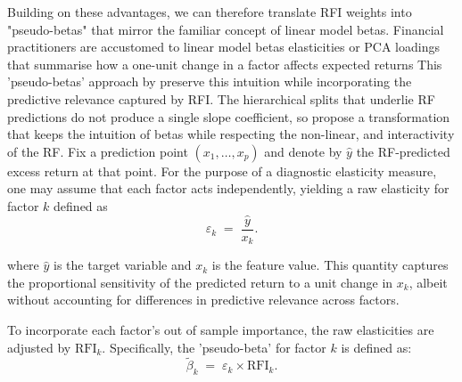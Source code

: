 Building on these advantages, we can therefore translate RFI weights into "pseudo-betas" that mirror the familiar concept of linear model betas. Financial practitioners are accustomed to linear model betas elasticities or PCA loadings that summarise how a one-unit change in a factor affects expected returns This 'pseudo-betas' approach by  preserve this intuition while incorporating the predictive relevance captured by RFI.  The hierarchical splits that underlie RF predictions do not produce a single slope coefficient, so  propose a transformation that keeps the intuition of betas while respecting the non-linear, and interactivity of the RF. Fix a prediction point \((x_{1},\dots,x_{p})\) and denote by \(\hat{y}\) the RF-predicted excess return at that point.  For the purpose of a diagnostic elasticity measure, one may assume that each factor acts independently, yielding a raw elasticity for factor \(k\) defined as
\begin{equation}
    \varepsilon_{k} \;=\; \frac{\hat{y}}{x_{k}}.
\end{equation}

where \(\hat{y}\) is the target variable and \(x_{k}\) is the feature value. This quantity captures the proportional sensitivity of the predicted return to a unit change in \(x_{k}\), albeit without accounting for differences in predictive relevance across factors.

To incorporate each factor's out of sample importance, the raw elasticities are adjusted by \(\mathrm{RFI}_{k}\). Specifically, the 'pseudo-beta' for factor \(k\) is defined as:
\begin{equation}
\tilde{\beta}_{k} \;=\; \varepsilon_{k} \times \mathrm{RFI}_{k}.    
\end{equation}

